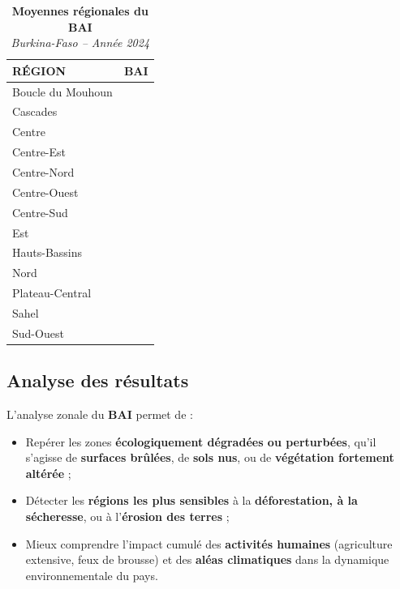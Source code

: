 \documentclass[
]{book}
\providecommand{\tightlist}{%
  \setlength{\itemsep}{0pt}\setlength{\parskip}{0pt}}
\begin{document}
\begin{table}[!t]
\caption*{
{\large \textbf{Moyennes régionales du BAI}} \\ 
{\small \emph{Burkina-Faso -- Année 2024}}
} 
\fontsize{12.0pt}{14.4pt}\selectfont
\begin{tabular*}{\linewidth}{@{\extracolsep{\fill}}lr}
\toprule
{RÉGION} & {BAI} \\ 
\midrule\addlinespace[2.5pt]
Boucle du Mouhoun & {\cellcolor[HTML]{FC8B6B}{\textcolor[HTML]{000000}{0.25}}} \\ 
Cascades & {\cellcolor[HTML]{FFF5F0}{\textcolor[HTML]{000000}{0.17}}} \\ 
Centre & {\cellcolor[HTML]{F75A3F}{\textcolor[HTML]{FFFFFF}{0.28}}} \\ 
Centre-Est & {\cellcolor[HTML]{F14230}{\textcolor[HTML]{FFFFFF}{0.29}}} \\ 
Centre-Nord & {\cellcolor[HTML]{CB181D}{\textcolor[HTML]{FFFFFF}{0.32}}} \\ 
Centre-Ouest & {\cellcolor[HTML]{FC8E6E}{\textcolor[HTML]{000000}{0.25}}} \\ 
Centre-Sud & {\cellcolor[HTML]{FC8C6B}{\textcolor[HTML]{000000}{0.25}}} \\ 
Est & {\cellcolor[HTML]{FB6E4E}{\textcolor[HTML]{FFFFFF}{0.27}}} \\ 
Hauts-Bassins & {\cellcolor[HTML]{FECEB9}{\textcolor[HTML]{000000}{0.21}}} \\ 
Nord & {\cellcolor[HTML]{D92723}{\textcolor[HTML]{FFFFFF}{0.31}}} \\ 
Plateau-Central & {\cellcolor[HTML]{E63328}{\textcolor[HTML]{FFFFFF}{0.30}}} \\ 
Sahel & {\cellcolor[HTML]{67000D}{\textcolor[HTML]{FFFFFF}{0.37}}} \\ 
Sud-Ouest & {\cellcolor[HTML]{FFF0E8}{\textcolor[HTML]{000000}{0.18}}} \\ 
\bottomrule
\end{tabular*}
\end{table}

\subsection{Analyse des résultats}\label{analyse-des-ruxe9sultats-4}

L'analyse zonale du \textbf{BAI} permet de :

\begin{itemize}
\tightlist
\item
  Repérer les zones \textbf{écologiquement dégradées ou perturbées}, qu'il s'agisse de \textbf{surfaces brûlées}, de \textbf{sols nus}, ou de \textbf{végétation fortement altérée} ;
\item
  Détecter les \textbf{régions les plus sensibles} à la \textbf{déforestation, à la sécheresse}, ou à l'\textbf{érosion des terres} ;
\item
  Mieux comprendre l'impact cumulé des \textbf{activités humaines} (agriculture extensive, feux de brousse) et des \textbf{aléas climatiques} dans la dynamique environnementale du pays.
\end{itemize}
\end{document}
